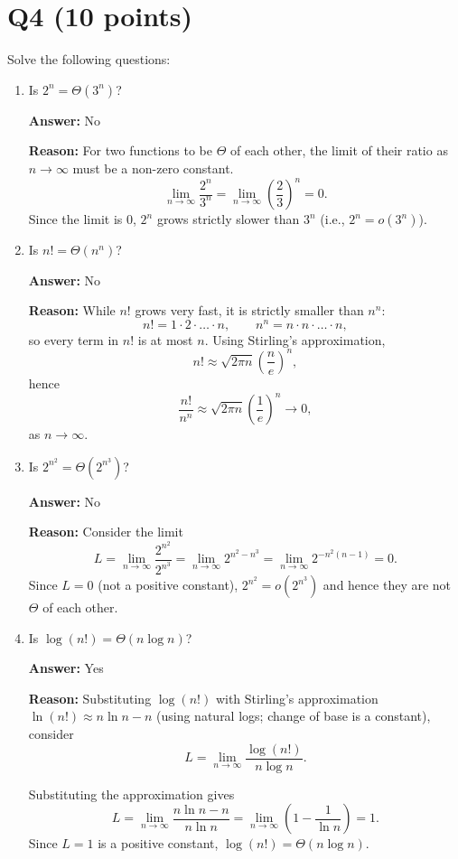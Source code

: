\documentclass[12pt]{article}
\begin{document}
\section*{Q4 (10 points)}
Solve the following questions:
\begin{enumerate}
  \item[(a)] Is $2^n = \Theta(3^n)$?

  \textbf{Answer:} No

  \textbf{Reason:} For two functions to be $\Theta$ of each other, the limit of their ratio as $n\to\infty$ must be a non-zero constant.
  \[
  \lim_{n\to\infty} \frac{2^n}{3^n} = \lim_{n\to\infty} \left(\frac{2}{3}\right)^n = 0.
  \]
  Since the limit is $0$, $2^n$ grows strictly slower than $3^n$ (i.e., $2^n = o(3^n)$).

  \item[(b)] Is $n! = \Theta(n^n)$?

  \textbf{Answer:} No

  \textbf{Reason:} While $n!$ grows very fast, it is strictly smaller than $n^n$:
  \[
  n! = 1\cdot 2\cdot \dots \cdot n,\qquad n^n = n\cdot n\cdot \dots \cdot n,
  \]
  so every term in $n!$ is at most $n$. Using Stirling's approximation,
  \[
  n! \approx \sqrt{2\pi n}\left(\frac{n}{e}\right)^n,
  \]
  hence
  \[
  \frac{n!}{n^n} \approx \sqrt{2\pi n}\left(\frac{1}{e}\right)^n \to 0,
  \]
  as $n\to\infty$.

  \item[(c)] Is $2^{n^2} = \Theta(2^{n^3})$?

  \textbf{Answer:} No

  \textbf{Reason:} Consider the limit
  \
  \[
  L = \lim_{n\to\infty} \frac{2^{n^2}}{2^{n^3}} = \lim_{n\to\infty} 2^{n^2 - n^3} = \lim_{n\to\infty} 2^{-n^2(n - 1)} = 0.
  \]
  Since $L=0$ (not a positive constant), $2^{n^2} = o(2^{n^3})$ and hence they are not $\Theta$ of each other.

  \item[(d)] Is $\log(n!) = \Theta(n\log n)$?

  \textbf{Answer:} Yes

  \textbf{Reason:} Substituting $\log(n!)$ with Stirling's approximation $\ln(n!) \approx n\ln n - n$ (using natural logs; change of base is a constant), consider
  \[
  L = \lim_{n\to\infty} \frac{\log(n!)}{n\log n}.
  \]

  Substituting the approximation gives
  \[
  L = \lim_{n\to\infty} \frac{n\ln n - n}{n\ln n} = \lim_{n\to\infty} \left(1 - \frac{1}{\ln n}\right) = 1.
  \]
  Since $L=1$ is a positive constant, $\log(n!) = \Theta(n\log n)$.
\end{enumerate}
\end{document}
